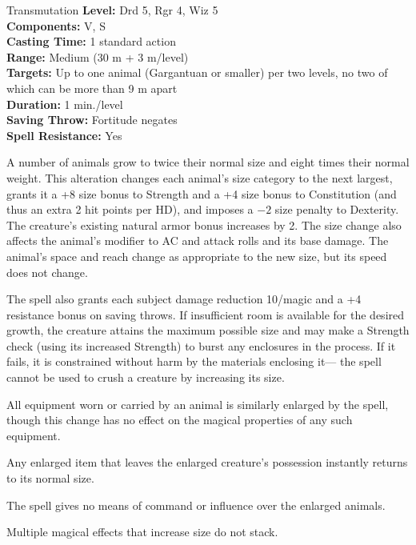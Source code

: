 {Transmutation}
{
	\textbf{Level:}
	Drd 5, Rgr 4, Wiz 5\\
	\textbf{Components:}
	V, S\\
	\textbf{Casting Time:}
	1 standard action\\
	\textbf{Range:}
	Medium (30 m + 3 m/level)\\
	\textbf{Targets:}
	Up to one animal (Gargantuan or smaller) per two levels, no two of which can be more than 9 m apart\\
	\textbf{Duration:}
	1 min./level\\
	\textbf{Saving Throw:}
	Fortitude negates\\
	\textbf{Spell Resistance:}
	Yes\\
}
{
	A number of animals grow to twice their normal size and eight times their normal weight. This alteration changes each animal's size category to the next largest, grants it a +8 size bonus to Strength and a +4 size bonus to Constitution (and thus an extra 2 hit points per HD), and imposes a $-2$ size penalty to Dexterity. The creature's existing natural armor bonus increases by 2. The size change also affects the animal's modifier to AC and attack rolls and its base damage. The animal's space and reach change as appropriate to the new size, but its speed does not change.

	The spell also grants each subject damage reduction 10/magic and a +4 resistance bonus on saving throws. If insufficient room is available for the desired growth, the creature attains the maximum possible size and may make a Strength check (using its increased Strength) to burst any enclosures in the process. If it fails, it is constrained without harm by the materials enclosing it--- the spell cannot be used to crush a creature by increasing its size.

	All equipment worn or carried by an animal is similarly enlarged by the spell, though this change has no effect on the magical properties of any such equipment.

	Any enlarged item that leaves the enlarged creature's possession instantly returns to its normal size.

	The spell gives no means of command or influence over the enlarged animals.

	Multiple magical effects that increase size do not stack.

}
